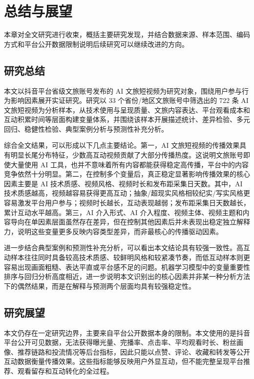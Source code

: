 \chapter{总结与展望}

本章对全文研究进行收束，概括主要研究发现，并结合数据来源、样本范围、编码方式和平台公开数据限制说明后续研究可以继续改进的方向。

\section{研究总结}

本文以抖音平台省级文旅账号发布的 AI 文旅短视频为研究对象，围绕用户参与行为影响因素展开实证研究。研究以 33 个省份/地区文旅账号中筛选出的 722 条 AI 文旅短视频为分析样本，从技术使用与呈现质量、文旅内容表达、平台观看成本和互动积累时间等层面构建变量体系，并围绕该样本开展描述统计、差异检验、多元回归、稳健性检验、典型案例分析与预测性补充分析。

综合全文结果，可以形成以下几点主要结论。第一，AI 文旅短视频的传播效果具有明显长尾分布特征，少数高互动视频贡献了大部分传播热度。这说明文旅账号即使大量使用 AI 工具，也并不意味着所有内容都能获得稳定高传播，平台中的内容竞争依然十分明显。第二，在控制多个变量后，真正稳定显著影响传播效果的核心因素主要是 AI 技术质感、视频风格、视频时长和发布距采集日天数。其中，AI 技术质感越高，视频越容易获得更高互动；抽象/超现实风格相较纪实/写实风格更容易激发平台用户参与；视频时长越长，互动表现越弱；发布距采集日天数越长，累计互动水平越高。第三，AI 介入形式、AI 介入程度、视频主体、视频主题和内容导向在单因素层面虽然存在差异，但在控制其他因素后并未表现出稳定独立解释力，说明这些变量更多反映内容类型差异，而非最核心的传播驱动因素。

进一步结合典型案例和预测性补充分析，可以看出本文结论具有较强一致性。高互动样本往往同时具备较高技术质感、较鲜明风格和较紧凑节奏，而低互动样本则更容易出现画面粗糙、表达平直或平台感不足的问题。机器学习模型中的变量重要性排序与回归分析高度相近，进一步说明本文识别出的核心因素并非某一种分析方法下的偶然结果，而是在解释与预测两个层面均具有较强稳定性。

\section{研究展望}

本文仍存在一定研究边界，主要来自平台公开数据本身的限制。本文使用的是抖音平台公开可见数据，无法获得曝光量、完播率、点击率、平均观看时长、粉丝画像、推荐链路和投流情况等后台指标，因此只能以点赞、评论、收藏和转发等公开互动数据衡量传播效果。这些指标能够反映用户外显互动，但不能完整呈现平台推荐、观看留存和互动转化的全过程。

